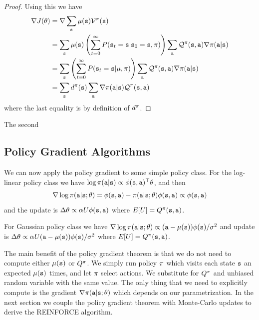 \begin{proof}
Using this we have
\begin{align*}
\nabla J(\theta) &= \nabla \sum_{{\tt s}} \mu({\tt s}) \mathcal{V}^\pi ({\tt s})\\
&= \sum_{\tt s} \mu({\tt s}) \left(\sum_{t=0}^\infty P({\tt s}_t = {\tt s} | {\tt s}_0 = {\tt s}, \pi) \right) \sum_{\tt a} \mathcal{Q}^\pi ({\tt s},{\tt a}) \nabla\pi({\tt a}|{\tt s}) \\
&= \sum_{\tt s} \left(\sum_{t=0}^\infty P({\tt s}_t = {\tt s} | \mu, \pi) \right) \sum_{\tt a} \mathcal{Q}^\pi ({\tt s},{\tt a}) \nabla\pi({\tt a}|{\tt s}) \\
&= \sum_{\tt s} d^{\pi}({\tt s}) \sum_{\tt a} \nabla\pi({\tt a}|{\tt s}) \mathcal{Q}^\pi ({\tt s},{\tt a}) \\
\end{align*}
where the last equality is by definition of $d^{\pi}$.
\end{proof}

The second 

\subsection{Policy Gradient Algorithms}




We can now apply the policy gradient to some simple policy
class. For the log-linear policy class we have $\log
\pi({\tt a}|{\tt s})\propto \phi({\tt s},{\tt a})^\top \theta$,
and then
\[
\nabla \log \pi({\tt a}|{\tt s};\theta)= \phi({\tt s},{\tt a}) - \pi({\tt a}|{\tt s};\theta)\phi({\tt s},{\tt a})\propto \phi({\tt s},{\tt a})
\]
and the update is $\Delta\theta \propto \alpha U
\phi({\tt s},{\tt a})$ where $E[U]=Q^\pi({\tt s},{\tt a})$.

For Gaussian policy class we have $\nabla \log
\pi({\tt a}|{\tt s};\theta)\propto
({\tt a}-\mu({\tt s}))\phi({\tt s})/\sigma^2$ and update is
$\Delta\theta \propto \alpha U
({\tt a}-\mu({\tt s}))\phi({\tt s})/\sigma^2$ where
$E[U]=Q^\pi({\tt s},{\tt a})$.




The main benefit of the policy gradient theorem is that we do not
need to compute either $\mu({\tt s})$ or $Q^\pi$. We simply run
policy $\pi$ which visits each state ${\tt s}$ an expected
 $\mu({\tt s})$ times, and let $\pi$ select
actions. We substitute for $Q^\pi$ and unbiased random variable
with the same value. The only thing that we need to explicitly
compute is the gradient $\nabla \pi({\tt a}|{\tt s};\theta)$
which depends on our parametrization. In the next section we couple
the policy gradient theorem with Monte-Carlo updates to derive the
REINFORCE algorithm.


